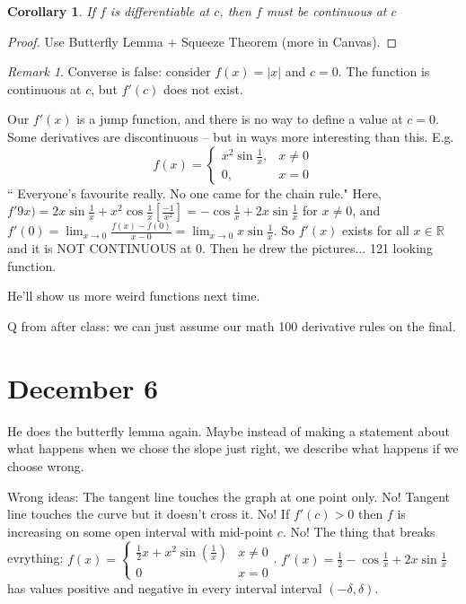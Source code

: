 \documentclass{article}
\theoremstyle{plain}
\newtheorem{corollary}{Corollary}
\theoremstyle{remark}
\newtheorem{remark}{Remark}
\newcommand{\R}{{\mathbb R}}
\begin{document}
\begin{corollary}
	If $f$ is differentiable at $c$, then $f$ must be continuous at $c$
\end{corollary}

\begin{proof}
	Use Butterfly Lemma + Squeeze Theorem (more in Canvas).
\end{proof}

\begin{remark}
	Converse is false: consider $f(x) = |x|$ and $c = 0$.
	The function is continuous at $c$, but $f'(c)$ does not exist.
\end{remark}
Our $f'(x)$ is a jump function, and there is no way to define a value at $c=0$.
Some derivatives are discontinuous -- but in ways more interesting than this. E.g.
\[
	f(x) = \begin{cases}
		x^2 \sin\frac{1}{x}, &x \neq 0\\
		0, &x=0
	\end{cases}
\]
`` Everyone's favourite really.
No one came for the chain rule."
Here, $f'9x) = 2x\sin{\frac{1}{x}} + x^2\cos{\frac{1}{x}} \left[\frac{-1}{x^2}\right]
= - \cos{\frac{1}{x}} + 2x\sin{\frac{1}{x}}$ for $x \neq 0$,
and $f'(0) = \lim_{x\to0} \frac{f(x) - f(0)}{x-0} = \lim_{x \to 0} x \sin{\frac{1}{x}}$.
So $f'(x)$ exists for all $x \in \R$ and it is NOT CONTINUOUS at $0$.
Then he drew the pictures...
121 looking function.

He'll show us more weird functions next time.

Q from after class: we can just assume our math 100 derivative rules on the final.

\section{December 6}
He does the butterfly lemma again.
Maybe instead of making a statement about what happens
when we chose the slope just right,
we describe what happens if we choose wrong.

Wrong ideas:
The tangent line touches the graph at one point only. No!
Tangent line touches the curve but it doesn't cross it. No!
If $f'(c)>0$ then $f$ is increasing on some open interval with mid-point $c$. No!
The thing that breaks evrything: $f(x) = \begin{cases} \frac12 x + x^2\sin(\frac{1}{x}) & x\neq 0 \\ 0 & x=0\end{cases}$.
$f'(x) = \frac12 - \cos{\frac{1}{x}} + 2x\sin{\frac{1}{x}}$ has values
positive and negative in every interval interval $(-\delta,\delta)$.
\end{document}

